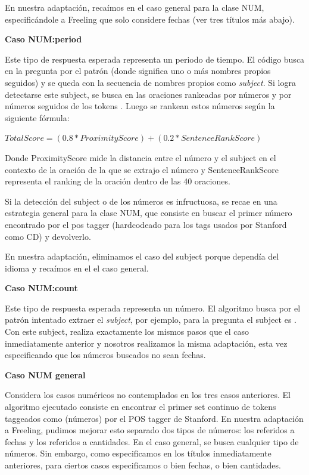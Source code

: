 En nuestra adaptación, recaímos en el caso general para la clase NUM, especificándole a Freeling que solo considere fechas (ver tres títulos más abajo).

\textbf{Caso NUM:period} \newline

Este tipo de respuesta esperada representa un periodo de tiempo. El código busca en la pregunta por el patrón  (donde  significa uno o más nombres propios seguidos) y se queda con la secuencia de nombres propios como \textit{subject}.
Si logra detectarse este subject, se busca en las oraciones rankeadas por números y por números seguidos de los tokens . Luego se rankean estos números según la siguiente fórmula:\newline

$TotalScore = (0.8 * ProximityScore) + (0.2 * SentenceRankScore)$ \newline

Donde ProximityScore mide la distancia entre el número y el subject en el contexto de la oración de la que se extrajo el número y SentenceRankScore representa el ranking de la oración dentro de las 40 oraciones.

Si la detección del subject o de los números es infructuosa, se recae en una estrategia general para la clase NUM, que consiste en buscar el primer número encontrado por el pos tagger (hardcodeado para los tags usados por Stanford como CD) y devolverlo.

En nuestra adaptación, eliminamos el caso del subject porque dependía del idioma y recaímos en el el caso general. \newline

\textbf{Caso NUM:count} \newline

Este tipo de respuesta esperada representa un número. El algoritmo busca por el patrón  intentado extraer el \textit{subject}, por ejemplo, para la pregunta  el subject es . Con este subject, realiza exactamente los mismos pasos que el caso inmediatamente anterior y nosotros realizamos la misma adaptación, esta vez especificando que los números buscados no sean fechas. \newline


\textbf{Caso NUM general} \newline

Considera los casos numéricos no contemplados en los tres casos anteriores. El algoritmo ejecutado consiste en encontrar el primer set continuo de tokens taggeados como  (números) por el POS tagger de Stanford. En nuestra adaptación a Freeling, pudimos mejorar esto separado dos tipos de números: los referidos a fechas y los referidos a cantidades. En el caso general, se busca cualquier tipo de números. Sin embargo, como especificamos en los títulos inmediatamente anteriores, para ciertos casos especificamos o bien fechas, o bien cantidades. \newline

